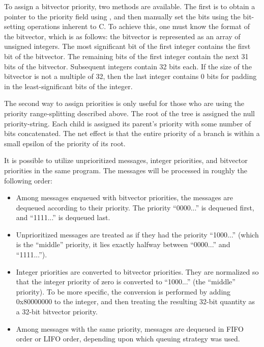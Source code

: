 To assign a bitvector priority, two methods are available.  The
first is to obtain a pointer to the priority field using  ,
and then manually set the bits using the bit-setting operations
inherent to C.  To achieve this, one must know the format
 of the
bitvector, which is as follows: the bitvector is represented as an
array of unsigned integers.  The most significant bit of the first
integer contains the first bit of the bitvector.  The remaining bits
of the first integer contain the next 31 bits of the bitvector.
Subsequent integers contain 32 bits each.  If the size of the
bitvector is not a multiple of 32, then the last integer contains 0
bits for padding in the least-significant bits of the integer.

The second way to assign priorities is only useful for those who are
using the priority range-splitting
described above.  The root of the tree is assigned the null
priority-string.  Each child is assigned its parent's priority with
some number of bits concatenated.  The net effect is that the entire
priority of a branch is within a small epsilon of the priority of its
root.

It is possible to utilize unprioritized messages, integer priorities,
and bitvector priorities in the same program.  The messages will be
processed in roughly the following order:

\begin{itemize}

\item Among messages enqueued with bitvector priorities, the
messages are dequeued according to their priority.  The
priority ``0000...'' is dequeued first, and ``1111...'' is
dequeued last.

\item Unprioritized messages are treated as if they had the
priority ``1000...'' (which is the ``middle'' priority, it
lies exactly halfway between ``0000...'' and ``1111...'').

\item Integer priorities are converted to bitvector priorities.  They
are normalized so that the integer priority of zero is converted to
``1000...'' (the ``middle'' priority).  To be more specific, the
conversion is performed by adding 0x80000000 to the integer, and then
treating the resulting 32-bit quantity as a 32-bit bitvector priority.

\item Among messages with the same priority, messages are
dequeued in FIFO order or LIFO order, depending upon which
queuing strategy was used.

\end{itemize}

